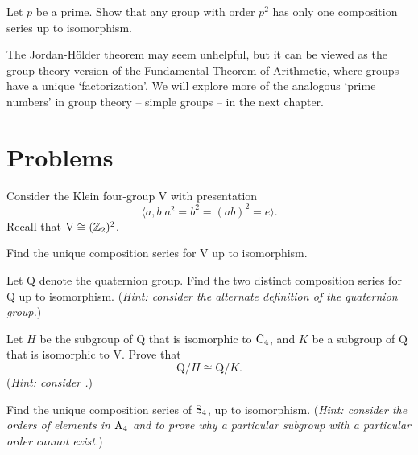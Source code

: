 \begin{exercise}
    Let $p$ be a prime. Show that any group with order $p^2$ has only one composition series up to isomorphism.
\end{exercise}

The Jordan-H\"older theorem may seem unhelpful, but it can be viewed as the group theory version of the Fundamental Theorem of Arithmetic, where groups have a unique `factorization'. We will explore more of the analogous `prime numbers' in group theory -- simple groups -- in the next chapter.

\newpage

\section{Problems}
\begin{problem}
    Consider the Klein four-group $\mathrm{V}$ with presentation
    \[
        \langle a, b \vert a^2 = b^2 = (ab)^2 = e \rangle.
    \]
    Recall that $\mathrm{V} \cong (\mathbb{Z}_2)^2$.
    \begin{partquestions}{\roman*}
        \item Find the unique composition series for $\mathrm{V}$ up to isomorphism.
        \item Let $\mathrm{Q}$ denote the quaternion group. Find the two distinct composition series for $\mathrm{Q}$ up to isomorphism.\newline
        (\textit{Hint: consider the alternate definition of the quaternion group.})
        \item Let $H$ be the subgroup of $\mathrm{Q}$ that is isomorphic to $\mathrm{C}_{4}$, and $K$ be a subgroup of $\mathrm{Q}$ that is isomorphic to $\mathrm{V}$. Prove that
        \[
            \mathrm{Q}/H \cong \mathrm{Q}/K.
        \]
        (\textit{Hint: consider .})
    \end{partquestions}
\end{problem}

\begin{problem}\label{problem-S4-composition-series}
    Find the unique composition series of $\mathrm{S}_{4}$, up to isomorphism.\newline
    (\textit{Hint: consider the orders of elements in $\mathrm{A}_{4}$ and  to prove why a particular subgroup with a particular order cannot exist.})
\end{problem}
